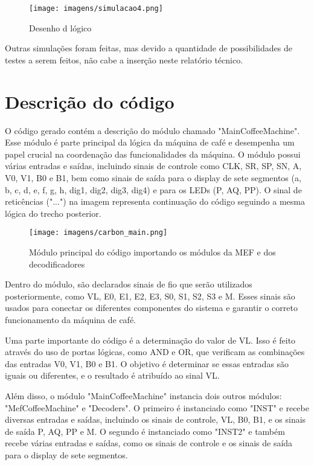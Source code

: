 \begin{figure}[]
    \centering
    \texttt{[image: imagens/simulacao4.png]}
    \caption{Desenho d lógico}
    \label{fig:simulacao4}
\end{figure}

Outras simulações foram feitas, mas devido a quantidade de possibilidades de testes a serem feitos, não cabe a inserção neste relatório técnico.

\section{Descrição do código}
O código gerado contém a descrição do módulo chamado "MainCoffeeMachine". Esse módulo é parte principal da lógica da máquina de café e desempenha um papel crucial na coordenação das funcionalidades da máquina. O módulo possui várias entradas e saídas, incluindo sinais de controle como CLK, SR, SP, SN, A, V0, V1, B0 e B1, bem como sinais de saída para o display de sete segmentos (a, b, c, d, e, f, g, h, dig1, dig2, dig3, dig4) e para os LEDs (P, AQ, PP). O sinal de reticências ("...") na imagem representa continuação do código seguindo a mesma lógica do trecho posterior.

\begin{figure}[!h]
    \centering
    \texttt{[image: imagens/carbon\_main.png]}
    \caption{Módulo principal do código importando os módulos da MEF e dos decodificadores}
    \label{fig:carbon_main}
\end{figure}

Dentro do módulo, são declarados sinais de fio que serão utilizados posteriormente, como VL, E0, E1, E2, E3, S0, S1, S2, S3 e M. Esses sinais são usados para conectar os diferentes componentes do sistema e garantir o correto funcionamento da máquina de café.

Uma parte importante do código é a determinação do valor de VL. Isso é feito através do uso de portas lógicas, como AND e OR, que verificam as combinações das entradas V0, V1, B0 e B1. O objetivo é determinar se essas entradas são iguais ou diferentes, e o resultado é atribuído ao sinal VL.

Além disso, o módulo "MainCoffeeMachine" instancia dois outros módulos: "MefCoffeeMachine" e "Decoders". O primeiro é instanciado como "INST" e recebe diversas entradas e saídas, incluindo os sinais de controle, VL, B0, B1, e os sinais de saída P, AQ, PP e M. O segundo é instanciado como "INST2" e também recebe várias entradas e saídas, como os sinais de controle e os sinais de saída para o display de sete segmentos.

